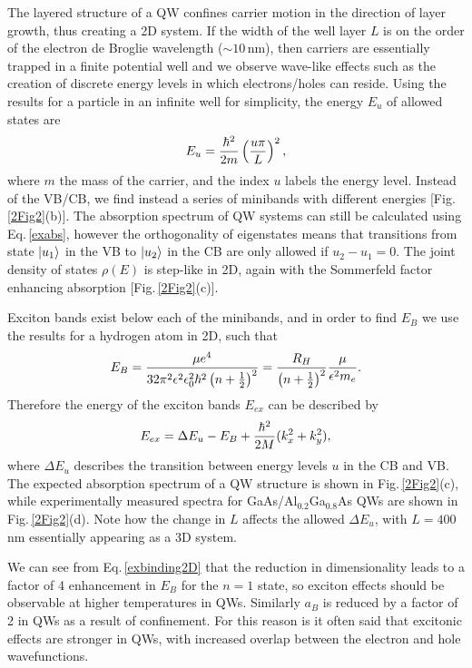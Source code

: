 The layered structure of a QW confines carrier motion in the direction of layer growth, thus creating a 2D system. If the width of the well layer $L$ is on the order of the electron de Broglie wavelength ($\sim10$\,nm), then carriers are essentially trapped in a finite potential well and we observe wave-like effects such as the creation of discrete energy levels in which electrons/holes can reside. Using the results for a particle in an infinite well for simplicity, the energy $E_u$ of allowed states are
\begin{equation}
\centering
E_u = \frac{\hbar^2}{2m} \left(\frac{u\pi}{L}\right)^2 ,
\label{particleboxenergy}
\end{equation}
where $m$ the mass of the carrier, and the index $u$ labels the energy level. Instead of the VB/CB, we find instead a series of minibands with different energies [Fig.\,\ref{2Fig2}(b)]. The absorption spectrum of QW systems can still be calculated using Eq.\,\ref{exabs}, however the orthogonality of eigenstates means that transitions from state $\Ket{u_1}$ in the VB to $\Ket{u_2}$ in the CB are only allowed if $u_2-u_1=0$. The joint density of states $\rho(E)$ is step-like in 2D, again with the Sommerfeld factor enhancing absorption [Fig.\,\ref{2Fig2}(c)].

Exciton bands exist below each of the minibands, and in order to find $E_B$ we use the results for a hydrogen atom in 2D, such that
\begin{equation}
\centering
E_B =\frac{\mu e^4}{32\pi^2\epsilon^2\epsilon_0^2\hbar^2\left(n+\frac{1}{2}\right)^2} = \frac{R_H}{\left(n+\frac{1}{2}\right)^2}\frac{\mu}{\epsilon^2 m_e} .
\label{exbinding2D}
\end{equation}
Therefore the energy of the exciton bands $E_{ex}$ can be described by
\begin{equation}
\centering
E_{ex} = \Delta E_u - E_B + \frac{\hbar^2}{2M}(k_x^2+k_y^2) ,
\label{exenergy2D}
\end{equation}
where $\Delta E_u$ describes the transition between energy levels $u$ in the CB and VB. The expected absorption spectrum of a QW structure is shown in Fig.\,\ref{2Fig2}(c), while experimentally measured spectra for GaAs/Al$_{0.2}$Ga$_{0.8}$As QWs are shown in Fig.\,\ref{2Fig2}(d). Note how the change in $L$ affects the allowed $\Delta E_u$, with $L=400$\,nm essentially appearing as a 3D system.

We can see from Eq.\,\ref{exbinding2D} that the reduction in dimensionality leads to a factor of 4 enhancement in $E_B$ for the $n=1$ state, so exciton effects should be observable at higher temperatures in QWs. Similarly $a_B$ is reduced by a factor of 2 in QWs as a result of confinement. For this reason is it often said that excitonic effects are stronger in QWs, with increased overlap between the electron and hole wavefunctions.


